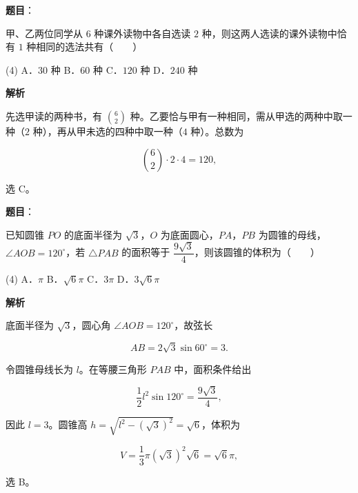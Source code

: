 \begin{answer}

\textbf{题目}：

甲、乙两位同学从 $6$ 种课外读物中各自选读 $2$ 种，则这两人选读的课外读物中恰有 $1$ 种相同的选法共有\mbox{（　　）}

\begin{gkopts}(4)
\task A．$30$ 种
\task B．$60$ 种
\task C．$120$ 种
\task D．$240$ 种
\end{gkopts}

\textbf{解析}

先选甲读的两种书，有 $\binom62$ 种。乙要恰与甲有一种相同，需从甲选的两种中取一种（$2$ 种），再从甲未选的四种中取一种（$4$ 种）。总数为

\nopagebreak[4]
\[
\binom62\cdot2\cdot4=120,
\]

选 C。


\end{answer}
\begin{answer}

\textbf{题目}：

已知圆锥 $PO$ 的底面半径为 $\sqrt3$，$O$ 为底面圆心，$PA$，$PB$ 为圆锥的母线，$\angle AOB=120^\circ$，若 $\triangle PAB$ 的面积等于 $\dfrac{9\sqrt3}{4}$，则该圆锥的体积为\mbox{（　　）}

\begin{gkopts}(4)
\task A．$\pi$
\task B．$\sqrt6\pi$
\task C．$3\pi$
\task D．$3\sqrt6\pi$
\end{gkopts}

\textbf{解析}

底面半径为 $\sqrt3$，圆心角 $\angle AOB=120^\circ$，故弦长

\nopagebreak[4]
\[
AB=2\sqrt3\sin60^\circ=3.
\]

令圆锥母线长为 $l$。在等腰三角形 $PAB$ 中，面积条件给出

\nopagebreak[4]
\[
\frac12l^2\sin120^\circ=\frac{9\sqrt3}{4},
\]

因此 $l=3$。圆锥高 $h=\sqrt{l^2-(\sqrt3)^2}=\sqrt6$，体积为

\nopagebreak[4]
\[
V=\frac13\pi(\sqrt3)^2\sqrt6=\sqrt6\pi,
\]

选 B。


\end{answer}
